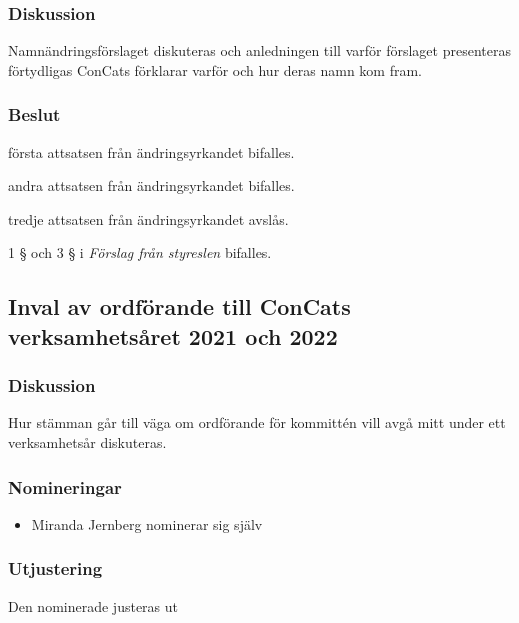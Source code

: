 \documentclass[protokoll]{dvd}
\begin{document}
    \subsubsection*{Diskussion}
    Namnändringsförslaget diskuteras och anledningen till varför förslaget presenteras förtydligas
    ConCats förklarar varför och hur deras namn kom fram.

    \subsubsection*{Beslut}
        \begin{attsatser}
            \item första attsatsen från ändringsyrkandet bifalles.
            \item andra attsatsen från ändringsyrkandet bifalles.
            \item tredje attsatsen från ändringsyrkandet avslås.
            \item 1 § och 3 § i \emph{Förslag från styreslen} bifalles.
        \end{attsatser}

\newpage

\subsection{Inval av ordförande till ConCats verksamhetsåret 2021 och 2022}

\subsubsection*{Diskussion}
Hur stämman går till väga om ordförande för kommittén vill avgå mitt under ett verksamhetsår diskuteras.

    \subsubsection*{Nomineringar}

        \begin{itemize}
            \item Miranda Jernberg nominerar sig själv
        \end{itemize}

        \subsubsection*{Utjustering}
        Den nominerade justeras ut
\end{document}

